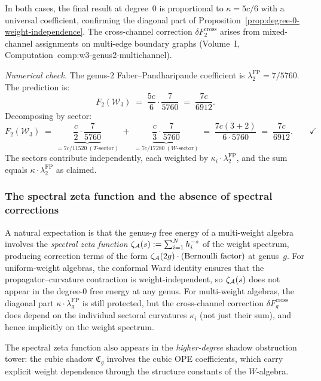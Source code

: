 \begin{computation}
In both cases, the final result at degree~$0$ is proportional to
$\kappa = 5c/6$ with a universal coefficient, confirming the
diagonal part of
Proposition~\ref{prop:degree-0-weight-independence}.
The cross-channel correction $\delta F_2^{\mathrm{cross}}$
arises from mixed-channel assignments on multi-edge boundary
graphs \textup{(}Volume~I,
Computation~\textup{comp:w3-genus2-multichannel)}.

\emph{Numerical check.} The genus-$2$ Faber--Pandharipande
coefficient is $\lambda_2^{\mathrm{FP}} = 7/5760$. The
prediction is:
\[
F_2(\mathcal{W}_3) \;=\; \frac{5c}{6} \cdot \frac{7}{5760}
\;=\; \frac{7c}{6912}.
\]
Decomposing by sector:
\[
F_2(\mathcal{W}_3) \;=\;
\underbrace{\frac{c}{2} \cdot \frac{7}{5760}}_{\displaystyle
 = 7c/11520\ (T\text{-sector})}
\;+\;
\underbrace{\frac{c}{3} \cdot \frac{7}{5760}}_{\displaystyle
 = 7c/17280\ (W\text{-sector})}
\;=\; \frac{7c(3+2)}{6 \cdot 5760}
\;=\; \frac{7c}{6912}. \qquad\checkmark
\]
The sectors contribute independently, each weighted by
$\kappa_i \cdot \lambda_2^{\mathrm{FP}}$, and the sum equals
$\kappa \cdot \lambda_2^{\mathrm{FP}}$ as claimed.
\end{computation}

\subsubsection{The spectral zeta function and the absence of
spectral corrections}

\begin{remark}
\label{rem:no-spectral-zeta}
A natural expectation is that the genus-$g$ free energy of a
multi-weight algebra involves the \emph{spectral zeta function}
$\zeta_{\mathcal{A}}(s) := \sum_{i=1}^N h_i^{-s}$ of the weight
spectrum, producing correction terms of the form
$\zeta_{\mathcal{A}}(2g) \cdot (\text{Bernoulli factor})$ at genus~$g$.
For uniform-weight algebras, the conformal Ward identity ensures
that the propagator--curvature contraction is weight-independent,
so $\zeta_{\mathcal{A}}(s)$ does not appear in the degree-$0$ free energy
at any genus. For multi-weight algebras, the diagonal part
$\kappa \cdot \lambda_g^{\mathrm{FP}}$ is still protected, but
the cross-channel correction $\delta F_g^{\mathrm{cross}}$
does depend on the individual sectoral curvatures
$\kappa_i$ \textup{(}not just their sum\textup{)}, and hence
implicitly on the weight spectrum.

The spectral zeta function also appears in the
\emph{higher-degree} shadow obstruction tower: the cubic shadow
$\mathfrak{C}_g$ involves the cubic OPE coefficients, which
carry explicit weight dependence through the structure constants
of the $W$-algebra.
\end{remark}

